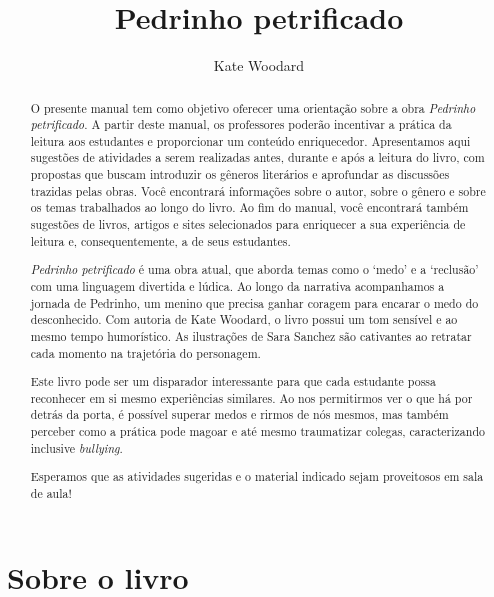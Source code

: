\documentclass[11pt]{extarticle}
\newcommand{\AutorLivro}{Kate Woodard}
\newcommand{\TituloLivro}{Pedrinho petrificado}
\newcommand{\colaborador}{Ana Lancman}
\begin{document}
\title{\TituloLivro}
\author{\AutorLivro}
\def\authornotes{\colaborador}

\date{}
\maketitle


\tableofcontents

\begin{abstract}
O presente manual tem como objetivo oferecer uma orientação sobre a obra \textit{Pedrinho petrificado}. A partir deste manual, os professores poderão incentivar a prática da leitura aos estudantes e proporcionar um conteúdo enriquecedor. Apresentamos aqui sugestões de atividades a serem realizadas antes, durante e após a leitura do livro, com propostas que buscam introduzir os gêneros literários e aprofundar as discussões trazidas pelas obras. Você encontrará informações sobre o autor, sobre o gênero e sobre os temas trabalhados ao longo do livro. Ao fim do manual, você encontrará também sugestões de livros, artigos e sites selecionados para enriquecer a sua experiência de leitura e, consequentemente, a de seus estudantes.

\textit{Pedrinho petrificado} é uma obra atual, que aborda temas como o `medo' e a `reclusão' com uma linguagem divertida e lúdica. Ao longo da narrativa acompanhamos a jornada de Pedrinho, um menino que precisa ganhar coragem para encarar o medo do desconhecido. Com autoria de Kate Woodard, o livro possui um tom sensível e ao mesmo tempo humorístico. As ilustrações de Sara Sanchez são cativantes ao retratar cada momento na trajetória do personagem. 

Este livro pode ser um disparador interessante para que cada estudante possa reconhecer em si mesmo experiências similares. Ao nos permitirmos ver o que há por detrás da porta, é possível superar medos e rirmos de nós mesmos, mas também perceber como a prática pode magoar e até mesmo traumatizar colegas, caracterizando inclusive \textit{bullying}. 

Esperamos que as atividades sugeridas e o material indicado sejam proveitosos em sala de aula! 

\end{abstract}

\section{Sobre o livro}
\end{document}
